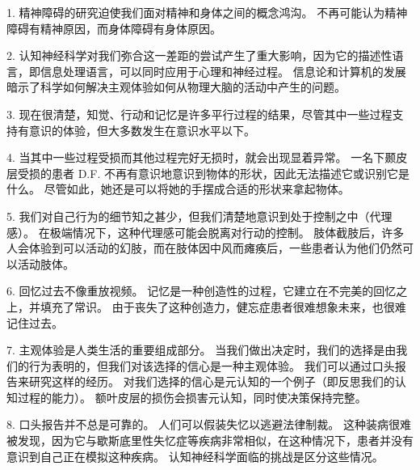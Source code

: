 1. 精神障碍的研究迫使我们面对精神和身体之间的概念鸿沟。
不再可能认为精神障碍有精神原因，而身体障碍有身体原因。


2. 认知神经科学对我们弥合这一差距的尝试产生了重大影响，因为它的描述性语言，即信息处理语言，可以同时应用于心理和神经过程。
信息论和计算机的发展暗示了科学如何解决主观体验如何从物理大脑的活动中产生的问题。


3. 现在很清楚，知觉、行动和记忆是许多平行过程的结果，尽管其中一些过程支持有意识的体验，但大多数发生在意识水平以下。 


4. 当其中一些过程受损而其他过程完好无损时，就会出现显着异常。
一名下颞皮层受损的患者 D.F. 不再有意识地意识到物体的形状，因此无法描述它或识别它是什么。
尽管如此，她还是可以将她的手摆成合适的形状来拿起物体。


5. 我们对自己行为的细节知之甚少，但我们清楚地意识到处于控制之中（代理感）。
在极端情况下，这种代理感可能会脱离对行动的控制。
肢体截肢后，许多人会体验到可以活动的幻肢，而在肢体因中风而瘫痪后，一些患者认为他们仍然可以活动肢体。
 

6. 回忆过去不像重放视频。
记忆是一种创造性的过程，它建立在不完美的回忆之上，并填充了常识。
由于丧失了这种创造力，健忘症患者很难想象未来，也很难记住过去。


7. 主观体验是人类生活的重要组成部分。
当我们做出决定时，我们的选择是由我们的行为表明的，但我们对该选择的信心是一种主观体验。
我们可以通过口头报告来研究这样的经历。
对我们选择的信心是元认知的一个例子（即反思我们的认知过程的能力）。
额叶皮层的损伤会损害元认知，同时使决策保持完整。 


8. 口头报告并不总是可靠的。
人们可以假装失忆以逃避法律制裁。
这种装病很难被发现，因为它与歇斯底里性失忆症等疾病非常相似，在这种情况下，患者并没有意识到自己正在模拟这种疾病。
认知神经科学面临的挑战是区分这些情况。


